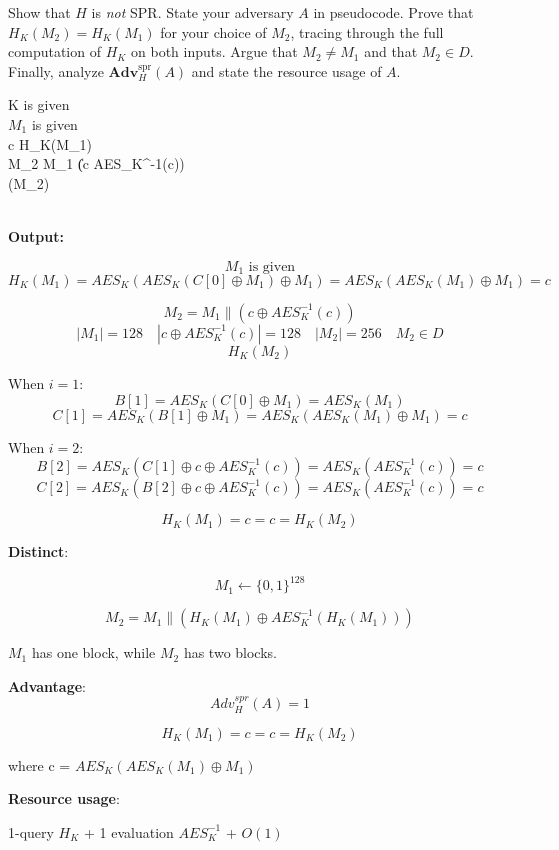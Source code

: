 \documentclass[11pt]{article}
\begin{document}
\medskip\noindent
Show that $H$ is \emph{not} SPR.
State your adversary $A$ in pseudocode.
Prove that $H_K(M_2) = H_K(M_1)$ for your choice of $M_2$, tracing
through the full computation of $H_K$ on both inputs.
Argue that $M_2 \neq M_1$ and that $M_2 \in D$.
Finally, analyze $\mathbf{Adv}^{\mathrm{spr}}_H(A)$ and state the resource usage of $A$.


\begin{algorithm}[H]
\caption{$A_H$}
K is given\\
$M_1$ is given\\
c \leftarrow H_K(M_1)\\
M_2 \leftarrow M_1 \| (c \oplus AES_K^{-1}(c))\\
\Return (M_2)
\end{algorithm}

\\

\noindent\textbf{Output:}

\[M_1 \text{ is given}\]
\[H_K(M_1) = AES_K(AES_K(C[0] \oplus M_1) \oplus M_1) = AES_K(AES_K(M_1) \oplus M_1) = c\]

\[M_2 = M_1 \| (c \oplus AES_K^{-1}(c))\]
\[|M_1| = 128 \quad |c \oplus AES_K^{-1}(c)| = 128 \quad |M_2| = 256 \quad M_2 \in D\]
\[H_K(M_2)\]

When $i=1$:
\[B[1] = AES_K(C[0] \oplus M_1) = AES_K(M_1)\]
\[C[1] = AES_K(B[1] \oplus M_1) = AES_K(AES_K(M_1) \oplus M_1) = c\]

When $i=2$:
\[B[2] = AES_K(C[1] \oplus c \oplus AES_K^{-1}(c)) = AES_K(AES_K^{-1}(c)) = c\]
\[C[2] = AES_K(B[2] \oplus c \oplus AES_K^{-1}(c)) = AES_K(AES_K^{-1}(c)) =  c\]

\[H_K(M_1) = c = c = H_K(M_2)\]

\noindent \textbf{Distinct}:

\[M_1 \leftarrow \{0,1\}^{128}\] 

\[M_2 = M_1 \| (H_K(M_1) \oplus AES_K^{-1}(H_K(M_1)))\]

$M_1$ has one block, while $M_2$ has two blocks.

\noindent \textbf{Advantage}:
\[Adv_H^{spr}(A) = 1\]

\[H_K(M_1) = c = c =H_K(M_2)\]

where c = $AES_K(AES_K(M_1) \oplus M_1)$

\noindent \textbf{Resource usage}:

1-query $H_K$ + 1 evaluation $AES_K^{-1}$ + $O(1)$
\end{document}
